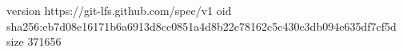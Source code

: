 version https://git-lfs.github.com/spec/v1
oid sha256:eb7d08e16171b6a6913d8cc0851a4d8b22c78162c5c430c3db094e635df7cf5d
size 371656
